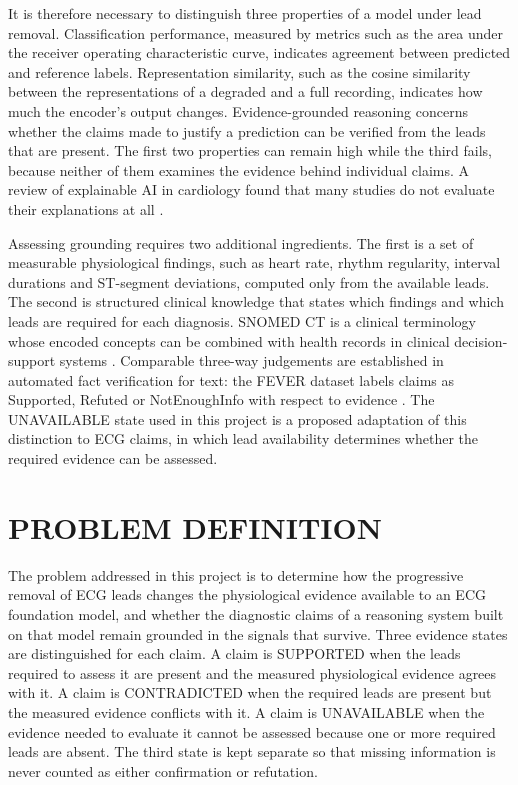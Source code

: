 It is therefore necessary to distinguish three properties of a model under lead removal. Classification performance, measured by metrics such as the area under the receiver operating characteristic curve, indicates agreement between predicted and reference labels. Representation similarity, such as the cosine similarity between the representations of a degraded and a full recording, indicates how much the encoder's output changes. Evidence-grounded reasoning concerns whether the claims made to justify a prediction can be verified from the leads that are present. The first two properties can remain high while the third fails, because neither of them examines the evidence behind individual claims. A review of explainable AI in cardiology found that many studies do not evaluate their explanations at all \cite{SALIH2024XAICARDIO}.

Assessing grounding requires two additional ingredients. The first is a set of measurable physiological findings, such as heart rate, rhythm regularity, interval durations and ST-segment deviations, computed only from the available leads. The second is structured clinical knowledge that states which findings and which leads are required for each diagnosis. SNOMED CT is a clinical terminology whose encoded concepts can be combined with health records in clinical decision-support systems \cite{SNOMED2026CDSGUIDE}. Comparable three-way judgements are established in automated fact verification for text: the FEVER dataset labels claims as Supported, Refuted or NotEnoughInfo with respect to evidence \cite{THORNE2018FEVER}. The UNAVAILABLE state used in this project is a proposed adaptation of this distinction to ECG claims, in which lead availability determines whether the required evidence can be assessed.

\section{PROBLEM DEFINITION}
The problem addressed in this project is to determine how the progressive removal of ECG leads changes the physiological evidence available to an ECG foundation model, and whether the diagnostic claims of a reasoning system built on that model remain grounded in the signals that survive. Three evidence states are distinguished for each claim. A claim is SUPPORTED when the leads required to assess it are present and the measured physiological evidence agrees with it. A claim is CONTRADICTED when the required leads are present but the measured evidence conflicts with it. A claim is UNAVAILABLE when the evidence needed to evaluate it cannot be assessed because one or more required leads are absent. The third state is kept separate so that missing information is never counted as either confirmation or refutation.

